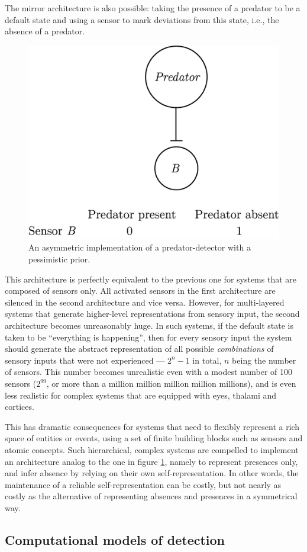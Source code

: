 \documentclass[12pt,twoside]{reedthesis}
\begin{document}
The mirror architecture is also possible: taking the presence of a predator to be a default state and using a sensor to mark deviations from this state, i.e., the absence of a predator.
\begin{figure}
\includegraphics[width=0.5\linewidth]{figure/intro/pessimistic} \caption{An asymmetric implementation of a predator-detector with a pessimistic prior.}\label{fig:intro-pessimistic}
\end{figure}
This architecture is perfectly equivalent to the previous one for systems that are composed of sensors only. All activated sensors in the first architecture are silenced in the second architecture and vice versa. However, for multi-layered systems that generate higher-level representations from sensory input, the second architecture becomes unreasonably huge. In such systems, if the default state is taken to be ``everything is happening'', then for every sensory input the system should generate the abstract representation of all possible \emph{combinations} of sensory inputs that were not experienced --- \(2^n-1\) in total, \(n\) being the number of sensors. This number becomes unrealistic even with a modest number of 100 sensors (\(2^{99}\), or more than a million million million million millions), and is even less realistic for complex systems that are equipped with eyes, thalami and cortices.

This has dramatic consequences for systems that need to flexibly represent a rich space of entities or events, using a set of finite building blocks such as sensors and atomic concepts. Such hierarchical, complex systems are compelled to implement an architecture analog to the one in figure \ref{fig:intro-pessimistic}, namely to represent presences only, and infer absence by relying on their own self-representation. In other words, the maintenance of a reliable self-representation can be costly, but not nearly as costly as the alternative of representing absences and presences in a symmetrical way.

\hypertarget{detectionmodels}{%
\subsection{Computational models of detection}\label{detectionmodels}}
\end{document}
